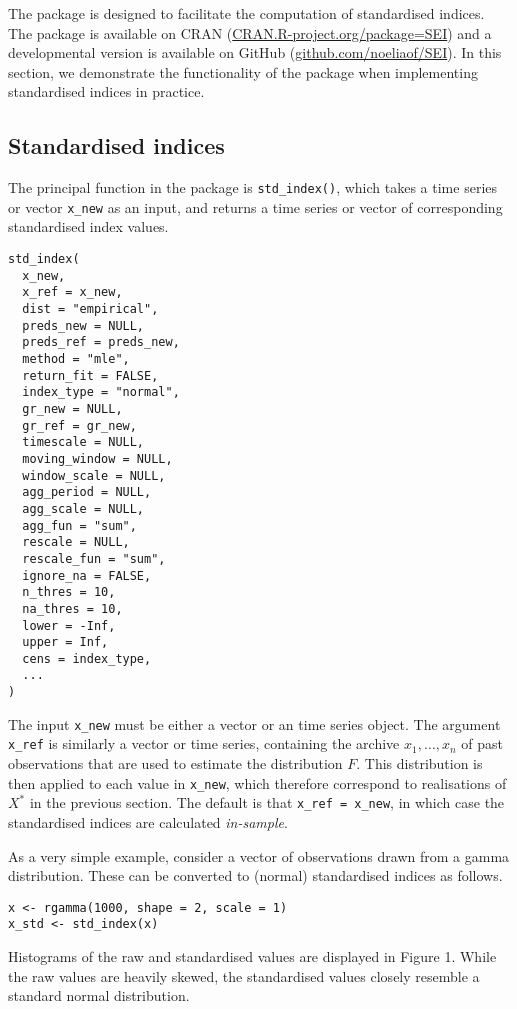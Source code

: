 The  package is designed to facilitate the computation of standardised indices. The package is available on CRAN (\url{CRAN.R-project.org/package=SEI}) and a developmental version is available on GitHub (\url{github.com/noeliaof/SEI}). In this section, we demonstrate the functionality of the  package when implementing standardised indices in practice.

\subsection{Standardised indices}\label{standardised-indices}

The principal function in the  package is \texttt{std\_index()}, which takes a time series or vector \texttt{x\_new} as an input, and returns a time series or vector of corresponding standardised index values.

\begin{verbatim}
std_index(
  x_new,
  x_ref = x_new,
  dist = "empirical",
  preds_new = NULL,
  preds_ref = preds_new,
  method = "mle",
  return_fit = FALSE,
  index_type = "normal",
  gr_new = NULL,
  gr_ref = gr_new,
  timescale = NULL,
  moving_window = NULL,
  window_scale = NULL,
  agg_period = NULL,
  agg_scale = NULL,
  agg_fun = "sum",
  rescale = NULL,
  rescale_fun = "sum",
  ignore_na = FALSE,
  n_thres = 10,
  na_thres = 10,
  lower = -Inf,
  upper = Inf,
  cens = index_type,
  ...
)
\end{verbatim}

The input \texttt{x\_new} must be either a vector or an  time series object. The argument \texttt{x\_ref} is similarly a vector or time series, containing the archive \(x_{1}, \dots, x_{n}\) of past observations that are used to estimate the distribution \(F\). This distribution is then applied to each value in \texttt{x\_new}, which therefore correspond to realisations of \(X^{*}\) in the previous section. The default is that \texttt{x\_ref\ =\ x\_new}, in which case the standardised indices are calculated \emph{in-sample}.

As a very simple example, consider a vector of observations drawn from a gamma distribution. These can be converted to (normal) standardised indices as follows.

\begin{verbatim}
x <- rgamma(1000, shape = 2, scale = 1)
x_std <- std_index(x)
\end{verbatim}

Histograms of the raw and standardised values are displayed in Figure 1. While the raw values are heavily skewed, the standardised values closely resemble a standard normal distribution.

